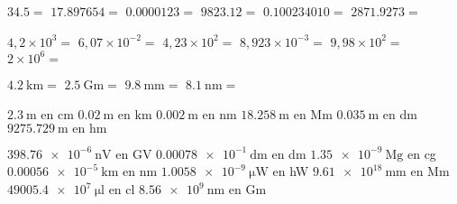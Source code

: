 \documentclass[../Cours.tex]{subfiles}
\begin{document}
\clearpage
\EXERCICES
\begin{questions}
    \vspace{-1.5em}
        \begin{multicols}{2}
            \question $\num{34,5} = $
            \question $\num{17,897654} =$
            \question $\num{0,0000123} =$
            \question $\num{9823,12} =$
            \question $\num{0,100234010} =$
            \question $\num{2871,9273} =$
        \end{multicols}

    \vspace{-1.5em}
        \begin{multicols}{2}
            \question $4,2 \times 10^3 = $
            \question $6,07 \times 10^{-2} =$
            \question $4,23 \times 10^2 =$
            \question $8,923 \times 10^{-3} =$
            \question $9,98 \times 10^{2} = $
            \question $2 \times 10^{6} = $
        \end{multicols}

    \vspace{-1.5em}
        \begin{multicols}{2}
            \question $\qty{4,2}{\kilo\metre} =$
            \question $\qty{2,5}{\giga\metre} =$
            \question $\qty{9,8}{\milli\metre} =$
            \question $\qty{8,1}{\nano\metre} =$
        \end{multicols}

    \vspace{-1.5em}
        \begin{multicols}{2}
            \question $\qty{2,3}{\metre} \mbox{~en~} \unit{\centi\metre}$
            \question $\qty{0,02}{\metre} \mbox{~en~} \unit{\kilo\metre}$
            \question $\qty{0,002}{\metre} \mbox{~en~} \unit{\nano\metre}$
            \question $\qty{18,258}{\metre} \mbox{~en~} \unit{\mega\metre}$
            \question $\qty{0,035}{\metre} \mbox{~en~} \unit{\deca\metre}$
            \question $\qty{9275,729}{\metre} \mbox{~en~} \unit{\hecto\metre}$
        \end{multicols}

    \vspace{-1.5em}
        \begin{multicols}{2}
            \question $\qty{398.76e-6}{\nano\volt}$ en \unit{\giga\volt}
            \question $\qty{0.00078e-1}{\deci\metre}$ en \unit{\deca\metre}
            \question $\qty{1.35e-9}{\mega\gram}$ en \unit{\centi\gram}
            \question $\qty{0.00056e-5}{\kilo\metre}$ en \unit{\nano\metre}
            \question $\qty{1.0058e-9}{\micro\watt}$ en \unit{\hecto\watt}
            \question $\qty{9.61e18}{\milli\metre}$ en \unit{\mega\metre}
            \question $\qty{49005.4e7}{\micro\litre}$ en \unit{\centi\litre}
            \question $\qty{8.56e9}{\nano\metre}$ en \unit{\giga\metre}
        \end{multicols}


\end{questions}
\end{document}
